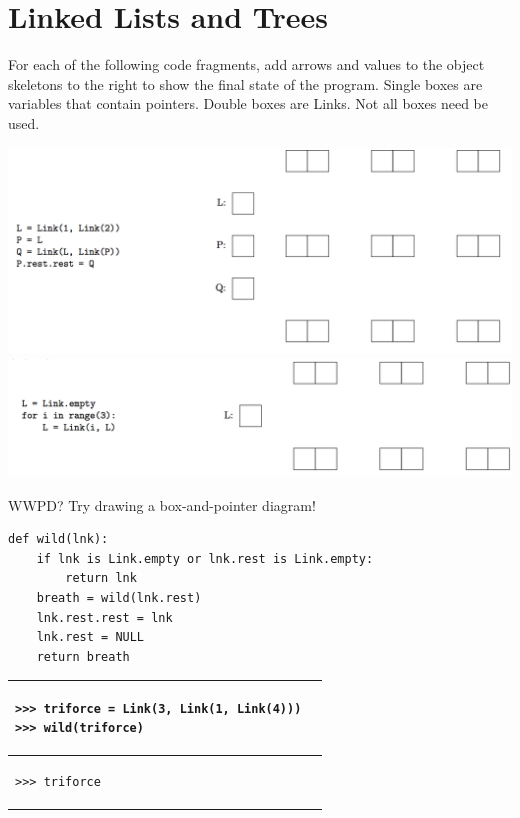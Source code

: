 \documentclass{exam}
\begin{document}
\section{Linked Lists and Trees}
\begin{questions}
\item For each of the following code fragments, add arrows and values to the object skeletons to the right to show the final state of the program. Single boxes are variables that contain pointers. Double boxes are Links. Not all boxes need be used.\\
\begin{center}
\vspace{1cm}
\includegraphics[width=15cm]{a}\\
\vspace{5cm}
 \includegraphics[width=15cm]{b}
\end{center}

\clearpage

\item WWPD? Try drawing a box-and-pointer diagram!
\begin{lstlisting}
def wild(lnk):
    if lnk is Link.empty or lnk.rest is Link.empty:
        return lnk
    breath = wild(lnk.rest)
    lnk.rest.rest = lnk
    lnk.rest = NULL
    return breath
\end{lstlisting}

\begin{center}
\begin{tabular}{ |p{8cm}|p{6cm}| } 
 \hline
 \begin{lstlisting}
>>> triforce = Link(3, Link(1, Link(4)))
>>> wild(triforce)
\end{lstlisting} &  \\  \hline
 \begin{lstlisting}
>>> triforce
\end{lstlisting} &  \\  \hline
\end{tabular}
\end{center}


\end{questions}
\end{document}
